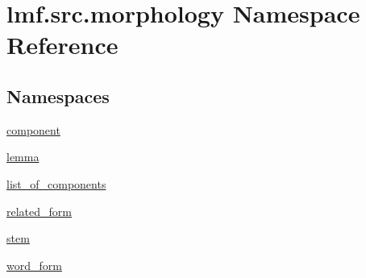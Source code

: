 \hypertarget{namespacelmf_1_1src_1_1morphology}{\section{lmf.\+src.\+morphology Namespace Reference}
\label{namespacelmf_1_1src_1_1morphology}
}
\subsection*{Namespaces}
\begin{DoxyCompactItemize}
\item 
 \hyperlink{namespacelmf_1_1src_1_1morphology_1_1component}{component}
\item 
 \hyperlink{namespacelmf_1_1src_1_1morphology_1_1lemma}{lemma}
\item 
 \hyperlink{namespacelmf_1_1src_1_1morphology_1_1list__of__components}{list\+\_\+of\+\_\+components}
\item 
 \hyperlink{namespacelmf_1_1src_1_1morphology_1_1related__form}{related\+\_\+form}
\item 
 \hyperlink{namespacelmf_1_1src_1_1morphology_1_1stem}{stem}
\item 
 \hyperlink{namespacelmf_1_1src_1_1morphology_1_1word__form}{word\+\_\+form}
\end{DoxyCompactItemize}

